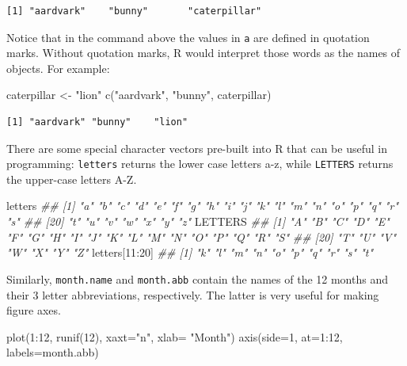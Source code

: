 \documentclass[
  13,
  letterpaper,
]{report}
\newenvironment{Shaded}{\begin{snugshade}}{\end{snugshade}}
\newcommand{\AttributeTok}[1]{\textcolor[rgb]{0.40,0.45,0.13}{#1}}
\newcommand{\DecValTok}[1]{\textcolor[rgb]{0.68,0.00,0.00}{#1}}
\newcommand{\DocumentationTok}[1]{\textcolor[rgb]{0.37,0.37,0.37}{\textit{#1}}}
\newcommand{\FunctionTok}[1]{\textcolor[rgb]{0.28,0.35,0.67}{#1}}
\newcommand{\NormalTok}[1]{\textcolor[rgb]{0.00,0.23,0.31}{#1}}
\newcommand{\OtherTok}[1]{\textcolor[rgb]{0.00,0.23,0.31}{#1}}
\newcommand{\SpecialCharTok}[1]{\textcolor[rgb]{0.37,0.37,0.37}{#1}}
\newcommand{\StringTok}[1]{\textcolor[rgb]{0.13,0.47,0.30}{#1}}
\begin{document}
\begin{verbatim}
[1] "aardvark"    "bunny"       "caterpillar"
\end{verbatim}

Notice that in the command above the values in \texttt{a} are defined in
quotation marks. Without quotation marks, R would interpret those words
as the names of objects. For example:

\begin{Shaded}
\begin{Highlighting}[]
\NormalTok{caterpillar }\OtherTok{\textless{}{-}} \StringTok{"lion"}
\FunctionTok{c}\NormalTok{(}\StringTok{"aardvark"}\NormalTok{, }\StringTok{"bunny"}\NormalTok{, caterpillar)}
\end{Highlighting}
\end{Shaded}

\begin{verbatim}
[1] "aardvark" "bunny"    "lion"    
\end{verbatim}

There are some special character vectors pre-built into R that can be
useful in programming: \texttt{letters} returns the lower case letters
a-z, while \texttt{LETTERS} returns the upper-case letters A-Z.

\begin{Shaded}
\begin{Highlighting}[]
\NormalTok{letters}
\DocumentationTok{\#\#  [1] "a" "b" "c" "d" "e" "f" "g" "h" "i" "j" "k" "l" "m" "n" "o" "p" "q" "r" "s"}
\DocumentationTok{\#\# [20] "t" "u" "v" "w" "x" "y" "z"}
\NormalTok{LETTERS}
\DocumentationTok{\#\#  [1] "A" "B" "C" "D" "E" "F" "G" "H" "I" "J" "K" "L" "M" "N" "O" "P" "Q" "R" "S"}
\DocumentationTok{\#\# [20] "T" "U" "V" "W" "X" "Y" "Z"}
\NormalTok{letters[}\DecValTok{11}\SpecialCharTok{:}\DecValTok{20}\NormalTok{]}
\DocumentationTok{\#\#  [1] "k" "l" "m" "n" "o" "p" "q" "r" "s" "t"}
\end{Highlighting}
\end{Shaded}

Similarly, \texttt{month.name} and \texttt{month.abb} contain the names
of the 12 months and their 3 letter abbreviations, respectively. The
latter is very useful for making figure axes.

\begin{Shaded}
\begin{Highlighting}[]
\FunctionTok{plot}\NormalTok{(}\DecValTok{1}\SpecialCharTok{:}\DecValTok{12}\NormalTok{, }\FunctionTok{runif}\NormalTok{(}\DecValTok{12}\NormalTok{), }\AttributeTok{xaxt=}\StringTok{"n"}\NormalTok{, }\AttributeTok{xlab=} \StringTok{"Month"}\NormalTok{)}
\FunctionTok{axis}\NormalTok{(}\AttributeTok{side=}\DecValTok{1}\NormalTok{, }\AttributeTok{at=}\DecValTok{1}\SpecialCharTok{:}\DecValTok{12}\NormalTok{, }\AttributeTok{labels=}\NormalTok{month.abb)}
\end{Highlighting}
\end{Shaded}
\end{document}
